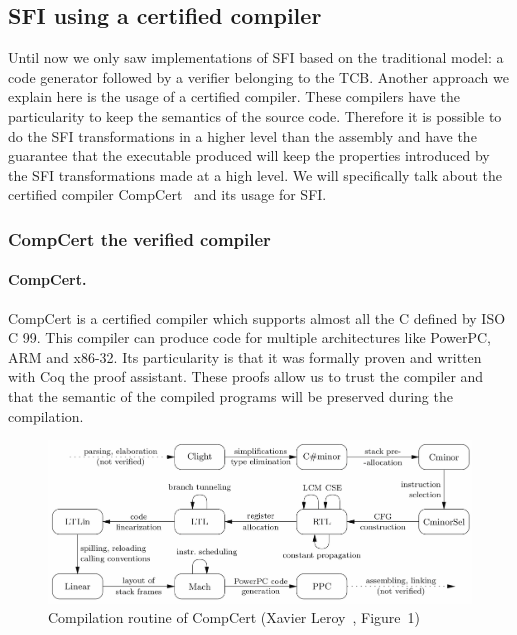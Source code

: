 \documentclass[11pt]{sdm}
\begin{document}
\subsection{SFI using a certified compiler}
\label{sub:sfi_comp}
	Until now we only saw implementations of SFI based on the traditional model: a code generator followed by a verifier belonging to the TCB. Another approach we explain here is the usage of a certified compiler. These compilers have the particularity to keep the semantics of the source code. Therefore it is possible to do the SFI transformations in a higher level than the assembly and have the guarantee that the executable produced will keep the properties introduced by the SFI transformations made at a high level. 
We will specifically talk about the certified compiler CompCert~\cite{Leroy:2009:FVR:1538788.1538814} and its usage for SFI. 

\subsubsection{CompCert the verified compiler}
\label{ssub:CompCert the verified compiler}
\paragraph{CompCert.}
\label{par:CompCert}
CompCert is a certified compiler which supports almost all the C defined by ISO C 99. This compiler can produce code for multiple architectures like PowerPC, ARM and x86-32. Its particularity is that it was formally proven and written with Coq the proof assistant. These proofs allow us to trust the compiler and that the semantic of the compiled programs will be preserved during the compilation.

\begin{figure}[!ht]
\centering
\includegraphics[scale=0.32]{images/compcert_pass.png}
\caption{Compilation routine of CompCert (Xavier Leroy~\cite{Leroy:2009:FVR:1538788.1538814}, Figure~1)}
\label{compcert_passes}
\end{figure}
\end{document}
